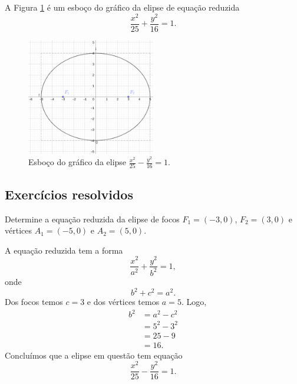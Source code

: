 \begin{ex}
  A Figura \ref{fig:elipse_ex} é um esboço do gráfico da elipse de equação reduzida
  \begin{equation}
    \frac{x^2}{25} + \frac{y^2}{16} = 1.
  \end{equation}

  \begin{figure}[H]
    \centering
    \includegraphics[width=0.5\textwidth]{cap_conicas/dados/fig_ex_elipse/fig}
    \caption{Esboço do gráfico da elipse $\displaystyle\frac{x^2}{25}-\frac{y^2}{16}=1$.}
    \label{fig:elipse_ex}
  \end{figure}
\end{ex}

\subsection*{Exercícios resolvidos}

\begin{exeresol}
  Determine a equação reduzida da elipse de focos $F_1=(-3,0)$, $F_2=(3,0)$ e vértices $A_1=(-5,0)$ e $A_2=(5,0)$.
\end{exeresol}
\begin{resol}
  A equação reduzida tem a forma
  \begin{equation}
    \frac{x^2}{a^2} + \frac{y^2}{b^2} = 1,
  \end{equation}
  onde
  \begin{equation}
    b^2 + c^2 = a^2.
  \end{equation}
  Dos focos temos $c=3$ e dos vértices temos $a=5$. Logo,
  \begin{align}
    b^2 &=  a^2 - c^2 \\
        &= 5^2 - 3^2 \\
        &= 25 - 9 \\
        &= 16.
  \end{align}
  Concluímos que a elipse em questão tem equação
  \begin{equation}
    \frac{x^2}{25} - \frac{y^2}{16} = 1.
  \end{equation}
\end{resol}

